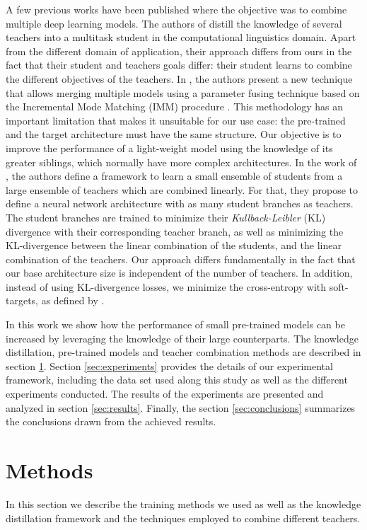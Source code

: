A few previous works have been published where the objective was to combine multiple deep learning models. The authors of \cite{liu2020} distill the knowledge of several teachers into a multitask student in the computational linguistics domain. Apart from the different domain of application, their approach differs from ours in the fact that their student and teachers goals differ: their student learns to combine the different objectives of the teachers. In \cite{geyer2019}, the authors present a new technique that allows merging multiple models using a parameter fusing technique based on the Incremental Mode Matching (IMM) procedure \cite{lee2017}. This methodology has an important limitation that makes it unsuitable for our use case: the pre-trained and the target architecture must have the same structure. Our objective is to improve the performance of a light-weight model using the knowledge of its greater siblings, which normally have more complex architectures. In the work of \cite{asif2019}, the authors define a framework to learn a small ensemble of students from a large ensemble of teachers which are combined linearly. For that, they propose to define a neural network architecture with as many student branches as teachers. The student branches are trained to minimize their \textit{Kullback-Leibler} (KL) divergence with their corresponding teacher branch, as well as minimizing the KL-divergence between the linear combination of the students, and the linear combination of the teachers. Our approach differs fundamentally in the fact that our base architecture size is independent of the number of teachers. In addition, instead of using KL-divergence losses, we minimize the cross-entropy with soft-targets, as defined by \cite{hinton2015}.

In this work we show how the performance of small pre-trained models can be increased by leveraging the knowledge of their large counterparts. The knowledge distillation, pre-trained models and teacher combination methods are described in section  \ref{sec:methods}. Section \ref{sec:experiments} provides the details of our experimental framework, including the data set used along this study as well as the different experiments conducted. The results of the experiments are presented and analyzed in section \ref{sec:results}. Finally, the section \ref{sec:conclusions} summarizes the conclusions drawn from the achieved results.

\section{Methods} \label{sec:methods}
In this section we describe the training methods we used as well as the knowledge distillation framework and the techniques employed to combine different teachers.

